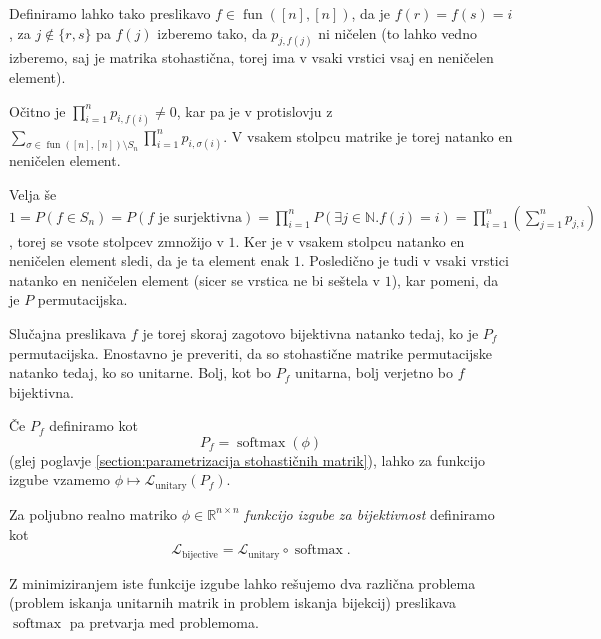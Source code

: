 \documentclass[mat2, tisk]{fmfdelo}
\newcommand{\R}{\mathbb R}
\newcommand{\N}{\mathbb N}
\newcommand{\fun}{\operatorname{fun}}
\newcommand{\funnn}[1]{\fun([#1], [#1])}
\newcommand{\Loss}[1]{\mathcal L _\text{#1}}
\begin{document}
\begin{dokaz}
              Definiramo lahko tako preslikavo $f \in \funnn{n}$, da
              je $f(r) = f(s) = i$, za $j \notin \{r, s\}$ pa $f(j)$
              izberemo tako, da $p_{j, f(j)}$ ni ničelen (to lahko
                vedno izberemo, saj je matrika stohastična, torej ima v
              vsaki vrstici vsaj en neničelen element).

              Očitno je $\prod_{i=1}^n p_{i, f(i)} \neq 0$, kar pa je
              v protislovju z $ \displaystyle \sum_{\sigma  \in
              \funnn{n} \setminus S_n} \prod_{i=1}^n p_{i,
              \sigma(i)}$.   V vsakem stolpcu matrike je torej
              natanko en neničelen element.

              Velja še $1 = P(f \in S_n) = P(f \text{ je
              surjektivna}) = \prod_{i=1}^n P(\exists j \in \N. f(j)= i) =
              \prod_{i=1}^n (\sum_{j=1}^n p_{j, i})$, torej se vsote
              stolpcev zmnožijo v $1$. Ker je v vsakem stolpcu
              natanko en neničelen element sledi, da je ta element
              enak $1$.  Posledično je tudi v vsaki vrstici natanko
              en neničelen element (sicer se vrstica ne bi seštela v
              $1$), kar pomeni, da je $P$ permutacijska.
            \end{dokaz}
            Slučajna preslikava $f$ je torej skoraj zagotovo
            bijektivna natanko tedaj, ko je $P_f$ permutacijska.
            Enostavno je preveriti, da so stohastične matrike
            permutacijske natanko tedaj, ko so unitarne. Bolj, kot bo
            $P_f$ unitarna, bolj verjetno bo $f$ bijektivna.

            Če $P_f$ definiramo kot
            $$P_f = \operatorname{softmax}(\phi)$$(glej poglavje
            \ref{section:parametrizacija stohastičnih matrik}), lahko
            za funkcijo izgube vzamemo $\phi \mapsto \Loss{unitary}(P_f)$.

            \begin{definicija}
              Za poljubno realno matriko $\phi \in \R^{n \times n}$
              \emph{funkcijo izgube za bijektivnost} definiramo kot
              $$
              \Loss{bijective} = \Loss{unitary} \circ \operatorname{softmax}.
              $$
            \end{definicija}
            Z minimiziranjem iste funkcije izgube lahko rešujemo dva
            različna problema (problem iskanja unitarnih matrik in
            problem iskanja bijekcij) preslikava
            $\operatorname{softmax}$  pa pretvarja med problemoma.
\end{document}

